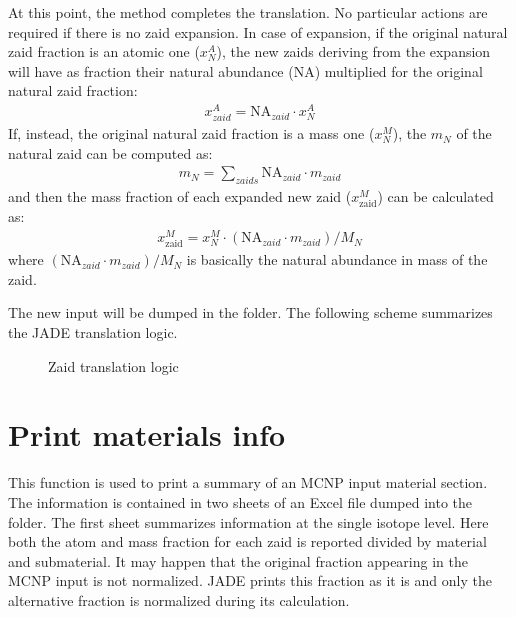 \documentclass[letterpaper,10pt,english]{sphinxmanual}
\let\sphinxpxdimen\pdfpxdimen\else\newdimen\sphinxpxdimen
\begin{document}
At this point, the  method completes the translation. No particular actions
are required if there is no zaid expansion.
In case of expansion, if the original natural zaid fraction is an atomic one
(\(x^A_N\)), the new zaids deriving from the expansion will have as fraction their
natural abundance (NA) multiplied for the original natural zaid fraction:
\begin{equation*}
\begin{split}x^A_{zaid} = \text{NA}_{zaid}\cdot x^A_N\end{split}
\end{equation*}
If, instead, the original natural zaid fraction is a mass one (\(x^M_N\)),
the  \(m_N\) of the natural zaid can be computed as:
\begin{equation*}
\begin{split}m_N = \sum_{zaids} \text{NA}_{zaid}\cdot m_{zaid}\end{split}
\end{equation*}
and then the mass fraction of each expanded new zaid (\(x^M_\text{zaid}\))
can be calculated as:
\begin{equation*}
\begin{split}x^M_\text{zaid}=x^M_N\cdot (\text{NA}_{zaid}\cdot m_{zaid})/M_N\end{split}
\end{equation*}
where \((\text{NA}_{zaid}\cdot m_{zaid})/M_N\)
is basically the natural abundance in mass of the zaid.

The new input will be dumped in the
 folder.
The following scheme summarizes the JADE translation logic.

\begin{figure}[htbp]
\centering
\capstart

\noindent\sphinxincludegraphics[width=600\sphinxpxdimen]{{Translation_logic}.jpg}
\caption{Zaid translation logic}\label{\detokenize{usage/utilities:id2}}\end{figure}


\section{Print materials info}
\label{\detokenize{usage/utilities:print-materials-info}}

This function is used to print a summary of an MCNP input material section.
The information is contained in two sheets of an Excel file dumped into the
 folder.
The first sheet summarizes information at the single isotope level.
Here both the atom and mass fraction for each zaid is reported divided by
material and submaterial. It may happen that the original fraction appearing
in the MCNP input is not normalized. JADE prints this fraction as it is and
only the alternative fraction is normalized during its calculation.
\end{document}
